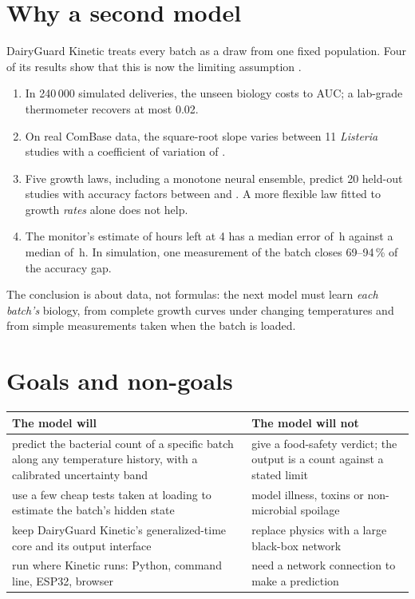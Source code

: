 \section{Why a second model}\label{sec:why}
DairyGuard Kinetic treats every batch as a draw from one fixed population. Four of its results show that this is now the limiting assumption \cite{book,wp01}.
\begin{enumerate}
\item In 240\,000 simulated deliveries, the unseen biology costs \NumBaseGapMin{} to \NumBaseGapMax{} AUC; a lab-grade thermometer recovers at most 0.02.
\item On real ComBase data, the square-root slope varies between 11 \textit{Listeria} studies with a coefficient of variation of \GlCvB.
\item Five growth laws, including a monotone neural ensemble, predict 20 held-out studies with accuracy factors between \GlLisArrAf{} and \GlLisSqrtAf. A more flexible law fitted to growth \emph{rates} alone does not help.
\item The monitor's estimate of hours left at 4\degC{} has a median error of \MsHlErr\,h against a median of \MsHlTrue\,h. In simulation, one measurement of the batch closes 69--94\,\% of the accuracy gap.
\end{enumerate}
The conclusion is about data, not formulas: the next model must learn \emph{each batch's} biology, from complete growth curves under changing temperatures and from simple measurements taken when the batch is loaded.

\section{Goals and non-goals}
\begin{center}\small\begin{tabular}{@{}p{7.1cm}p{6.6cm}@{}}\toprule\rowcolor{dghead}
The model will & The model will not\\\midrule
predict the bacterial count of a specific batch along any temperature history, with a calibrated uncertainty band & give a food-safety verdict; the output is a count against a stated limit\\
use a few cheap tests taken at loading to estimate the batch's hidden state & model illness, toxins or non-microbial spoilage\\
keep DairyGuard Kinetic's generalized-time core and its output interface & replace physics with a large black-box network\\
run where Kinetic runs: Python, command line, ESP32, browser & need a network connection to make a prediction\\
\bottomrule\end{tabular}\end{center}


